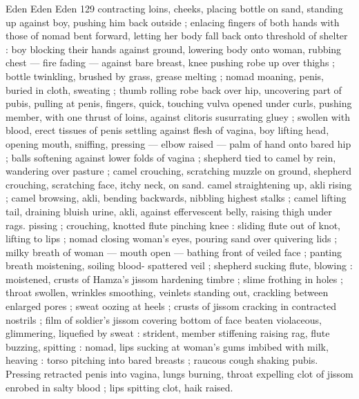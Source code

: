 Eden Eden Eden 129
contracting loins, cheeks, placing bottle on sand, standing up against
boy, pushing him back outside ; enlacing fingers of both hands with
those of nomad bent forward, letting her body fall back onto
threshold of shelter : boy blocking their hands against ground,
lowering body onto woman, rubbing chest — fire fading — against
bare breast, knee pushing robe up over thighs ; bottle twinkling,
brushed by grass, grease melting ; nomad moaning, penis, buried in
cloth, sweating ; thumb rolling robe back over hip, uncovering part of
pubis, pulling at penis, fingers, quick, touching vulva opened under
curls, pushing member, with one thrust of loins, against clitoris
susurrating gluey ; swollen with blood, erect tissues of penis settling
against flesh of vagina, boy lifting head, opening mouth, sniffing,
pressing — elbow raised — palm of hand onto bared hip ; balls
softening against lower folds of vagina ; shepherd tied to camel by
rein, wandering over pasture ; camel crouching, scratching muzzle on
ground, shepherd crouching, scratching face, itchy neck, on sand.
camel straightening up, akli rising ; camel browsing, akli, bending
backwards, nibbling highest stalks ; camel lifting tail, draining bluish
urine, akli, against effervescent belly, raising thigh under rags.
pissing ; crouching, knotted flute pinching knee : sliding flute out of
knot, lifting to lips ; nomad closing woman's eyes, pouring sand over
quivering lids ; milky breath of woman — mouth open — bathing
front of veiled face ; panting breath moistening, soiling blood-
spattered veil ; shepherd sucking flute, blowing : moistened, crusts
of Hamza's jissom hardening timbre ; slime frothing in holes ; throat
swollen, wrinkles smoothing, veinlets standing out, crackling
between enlarged pores ; sweat oozing at heels ; crusts of jissom
cracking in contracted nostrils ; film of soldier's jissom covering
bottom of face beaten violaceous, glimmering, liquefied by sweat :
strident, member stiffening raising rag, flute buzzing, spitting :
nomad, lips sucking at woman's gums imbibed with milk, heaving :
torso pitching into bared breasts ; raucous cough shaking pubis.
Pressing retracted penis into vagina, lungs burning, throat expelling
clot of jissom enrobed in salty blood ; lips spitting clot, haik raised.

